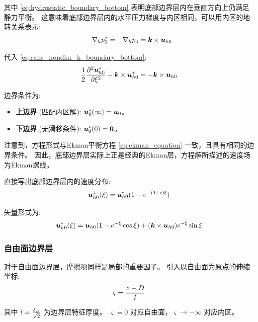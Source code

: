 其中 \eqref{eq:hydrostatic_boundary_bottom} 表明底部边界层内在垂直方向上仍满足静力平衡。
这意味着底部边界层内的水平压力梯度与内区相同，可以用内区的地转关系表示:
\begin{equation*}
    -\nabla_h p_0^* = -\nabla_{h} p_0 = \bm{k} \times \bm{u}_{h0}
\end{equation*}

代入 \eqref{eq:rans_nondim_h_boundary_bottom}:
\begin{equation*}
    \frac{1}{2} \pde[2]{\flayer{\vel_{h0}}}{\xi} -\kvec \times \flayer{\vel_{h0}} = -\kvec \times \vel_{h0}
\end{equation*}

边界条件为:
\begin{itemize}
    \item \textbf{上边界} (匹配内区解): $\bm{u}_{0}^*(\infty) = \bm{u}_{0}$。
    \item \textbf{下边界} (无滑移条件): $\bm{u}_{0}^*(0) = \bm{0}$。
\end{itemize}

注意到，方程形式与Ekman平衡方程 \eqref{eq:ekman_equation} 一致，且具有相同的边界条件。
因此，底部边界层实际上正是经典的Ekman层，方程解所描述的速度场为Ekman螺线。

直接写出底部边界层内的速度分布:
\begin{equation}
    \tilde{\bm{u}_{h0}^*}(\xi) = \tilde{\bm{u}_{h0}} (1 - e^{-(1+i) \xi})
    \label{eq:solution_complex_boundary_bottom}
\end{equation}

矢量形式为:
\begin{equation}
    \bm{u}_{h0}^*(\xi) = \bm{u}_{h0}(1 - e^{-\xi} \cos\xi) + (\bm{k} \times \bm{u}_{h0}) e^{-\xi} \sin\xi
    \label{eq:solution_boundary_bottom}
\end{equation}

\subsubsection{自由面边界层}

对于自由面边界层，摩擦项同样是局部的重要因子。
引入以自由面为原点的伸缩坐标:
\begin{equation}
    \varsigma = \frac{z - D}{l}
    \label{eq:stretched_coordinate_top}
\end{equation}

其中 $l = \frac{\delta_E}{\sqrt{2}}$ 为边界层特征厚度。
$\varsigma = 0$ 对应自由面，$\varsigma \to -\infty$ 对应内区。

